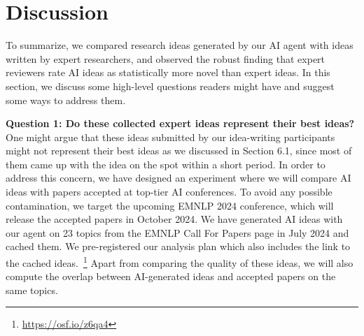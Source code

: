 \section{Discussion}
\label{sec:discussion}

To summarize, we compared research ideas generated by our AI agent with ideas written by expert researchers, and observed the robust finding that expert reviewers rate AI ideas as statistically more novel than expert ideas. In this section, we discuss some high-level questions readers might have and suggest some ways to address them. 


\textbf{Question 1: Do these collected expert ideas represent their best ideas?}
One might argue that these ideas submitted by our idea-writing participants might not represent their best ideas as we discussed in Section 6.1, since most of them came up with the idea on the spot within a short period. 
In order to address this concern, we have designed an experiment where we will compare AI ideas with papers accepted at top-tier AI conferences. 
To avoid any possible contamination, we target the upcoming EMNLP 2024 conference, which will release the accepted papers in October 2024. 
We have generated AI ideas with our agent on 23 topics from the EMNLP Call For Papers page in July 2024 and cached them. 
We pre-registered our analysis plan which also includes the link to the cached ideas.~\footnote{\url{https://osf.io/z6qa4}}
Apart from comparing the quality of these ideas, we will also compute the overlap between AI-generated ideas and accepted papers on the same topics. 

